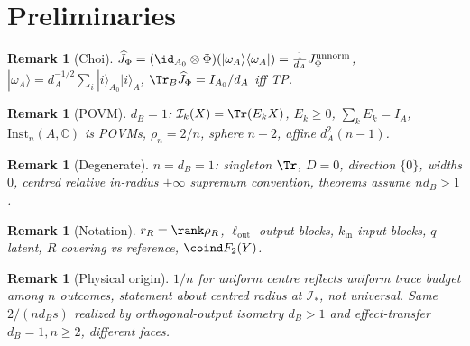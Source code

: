 \documentclass[11pt,a4paper]{article}
\newtheorem{remark}[theorem]{Remark}
\newcommand{\Inst}{\mathrm{Inst}}
\begin{document}
\section{Preliminaries}
\begin{remark}[Choi]
$\widehat J_\Phi=(\id_{A_0}\otimes\Phi)(|\omega_A\rangle\langle\omega_A|)=\frac1{d_A}J_\Phi^{\mathrm{unnorm}}$, $|\omega_A\rangle=d_A^{-1/2}\sum_i|i\rangle_{A_0}|i\rangle_A$, $\Tr_B\widehat J_\Phi=I_{A_0}/d_A$ iff TP.
\end{remark}
\begin{remark}[POVM]
$d_B=1$: $\mathcal I_k(X)=\Tr(E_kX)$, $E_k\ge0$, $\sum_kE_k=I_A$, $\Inst_n(A,\mathbb C)$ is POVMs, $\rho_n=2/n$, sphere $n-2$, affine $d_A^2(n-1)$.
\end{remark}
\begin{remark}[Degenerate]
$n=d_B=1$: singleton $\Tr$, $D=0$, direction $\{0\}$, widths $0$, centred relative in-radius $+\infty$ supremum convention, theorems assume $nd_B>1$.
\end{remark}
\begin{remark}[Notation]
$r_R=\rank\rho_R$, $\ell_{\mathrm{out}}$ output blocks, $k_{\mathrm{in}}$ input blocks, $q$ latent, $R$ covering vs reference, $\coind F_2(Y)$.
\end{remark}
\begin{remark}[Physical origin]
$1/n$ for uniform centre reflects uniform trace budget among $n$ outcomes, statement about centred radius at $\mathcal I_*$, not universal. Same $2/(nd_Bs)$ realized by orthogonal-output isometry $d_B>1$ and effect-transfer $d_B=1,n\ge2$, different faces.
\end{remark}
\end{document}

